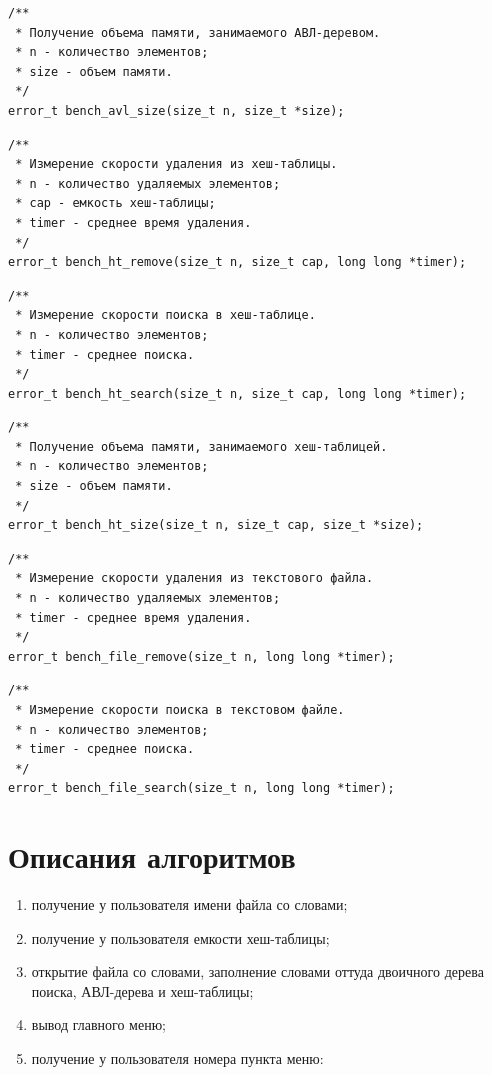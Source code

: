 \documentclass[a4paper,12pt]{extarticle}
\begin{document}
\begin{verbatim}
/**
 * Получение объема памяти, занимаемого АВЛ-деревом.
 * n - количество элементов;
 * size - объем памяти.
 */
error_t bench_avl_size(size_t n, size_t *size);
\end{verbatim}

\begin{verbatim}
/**
 * Измерение скорости удаления из хеш-таблицы.
 * n - количество удаляемых элементов;
 * cap - емкость хеш-таблицы;
 * timer - среднее время удаления.
 */
error_t bench_ht_remove(size_t n, size_t cap, long long *timer);
\end{verbatim}

\begin{verbatim}
/**
 * Измерение скорости поиска в хеш-таблице.
 * n - количество элементов;
 * timer - среднее поиска.
 */
error_t bench_ht_search(size_t n, size_t cap, long long *timer);
\end{verbatim}

\begin{verbatim}
/**
 * Получение объема памяти, занимаемого хеш-таблицей.
 * n - количество элементов;
 * size - объем памяти.
 */
error_t bench_ht_size(size_t n, size_t cap, size_t *size);
\end{verbatim}

\begin{verbatim}
/**
 * Измерение скорости удаления из текстового файла.
 * n - количество удаляемых элементов;
 * timer - среднее время удаления.
 */
error_t bench_file_remove(size_t n, long long *timer);
\end{verbatim}

\begin{verbatim}
/**
 * Измерение скорости поиска в текстовом файле.
 * n - количество элементов;
 * timer - среднее поиска.
 */
error_t bench_file_search(size_t n, long long *timer);
\end{verbatim}


\newpage
\section{Описания алгоритмов}

\begin{enumerate}
	\item получение у пользователя имени файла со словами;
	\item получение у пользователя емкости хеш-таблицы;
	\item открытие файла со словами, заполнение словами оттуда двоичного дерева поиска, АВЛ-дерева и хеш-таблицы;
    \item вывод главного меню;
    \item получение у пользователя номера пункта меню:
\end{enumerate}
\end{document}
